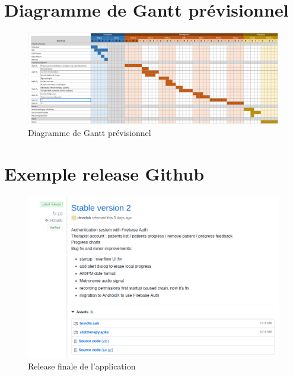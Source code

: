 \begin{appendices}
\begin{landscape}
  \label{appendix:gantt}
  \chapter{Diagramme de Gantt prévisionnel}
  \begin{figure}[H]
    \includegraphics[width=1\linewidth]{content/imgs/gantt.png}
    \caption*{Diagramme de Gantt prévisionnel}
  \end{figure}
\end{landscape}


\chapter{Exemple release Github}
\label{appendix:release}
\begin{figure}[H]
  \includegraphics[width=1\linewidth]{content/imgs/release_ex.png}
  \caption*{Release finale de l'application}
\end{figure}


\end{appendices}
